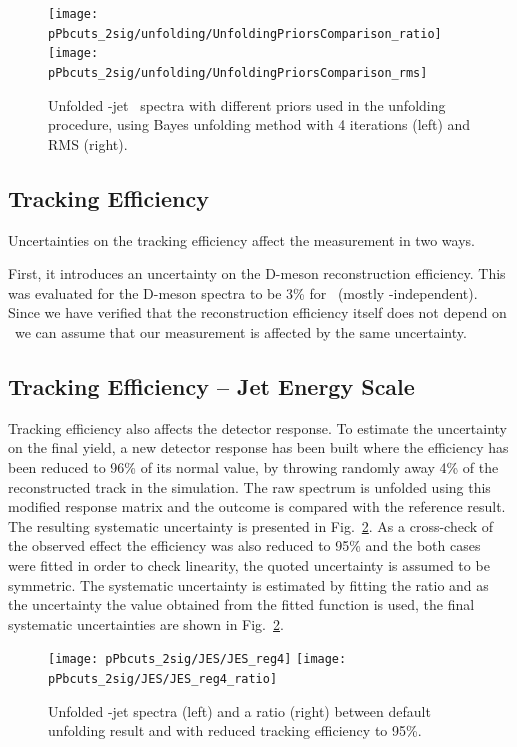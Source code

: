 \begin{figure}[bth]
\centering
\texttt{[image: pPbcuts\_2sig/unfolding/UnfoldingPriorsComparison\_ratio]}
\texttt{[image: pPbcuts\_2sig/unfolding/UnfoldingPriorsComparison\_rms]}
\caption{Unfolded \Dzero-jet \pt\ spectra with different priors used in the unfolding procedure, using Bayes unfolding method with 4 iterations (left) and RMS (right).}
\label{fig:UnfSpec_pPb_Dzero_priors}
\end{figure}


\subsection{Tracking Efficiency}

Uncertainties on the tracking efficiency affect the measurement in two ways. 

First, it introduces an uncertainty on the D-meson reconstruction efficiency. This was evaluated for the D-meson spectra to be 3\% for \Dzero\ (mostly \pt-independent). Since we have verified that the reconstruction efficiency itself does not depend on \ptchjet\ we can assume that our measurement is affected by the same uncertainty.

\subsection{Tracking Efficiency -- Jet Energy Scale}


Tracking efficiency also affects the detector response. To estimate the uncertainty on the final yield, a new detector response has been built where the efficiency has been reduced to 96\% of its normal value, by throwing randomly away 4\% of the reconstructed track in the simulation.
The raw spectrum is unfolded using this modified response matrix and the outcome is compared with the reference result. The resulting systematic uncertainty is presented in Fig.~\ref{fig:JESsys_Dzero}. As a cross-check of the observed effect the efficiency was also reduced to 95\% and the both cases were fitted in order to check linearity, the quoted uncertainty is assumed to be symmetric. 
The systematic uncertainty is estimated by fitting the ratio and as the uncertainty the value obtained from the fitted function is used, the final systematic uncertainties are shown in Fig.~\ref{fig:JESsys_Dzero}.


\begin{figure}[bth]
\centering
\texttt{[image: pPbcuts\_2sig/JES/JES\_reg4]}
\texttt{[image: pPbcuts\_2sig/JES/JES\_reg4\_ratio]}
\caption{Unfolded \Dzero-jet spectra (left) and a ratio (right) between default unfolding result and with reduced tracking efficiency to 95\%.}
\label{fig:JESsys_Dzero}
\end{figure}


